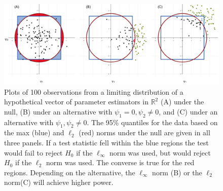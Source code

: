 \documentclass{article}
\begin{document}

\begin{figure}
	\centering
	\includegraphics[width = \linewidth]{figure_code/new_pwr_cmpr.jpeg}
	\caption{Plots of 100 observations from a limiting distribution of a hypothetical vector of parameter estimators in $\mathbb{R}^2$ (A) under the null, (B) under an alternative with $\psi_1 = 0, \psi_2 \neq 0$, and (C) under an alternative with $\psi_1, \psi_2 \neq 0$. The 95\% quantiles for the data based on the max (blue) and $\ell_2$ (red) norms under the null are given in all three panels. If a test statistic fell within the blue regions the test would fail to reject $H_0$ if the $\ell_\infty$ norm was used, but would reject $H_0$ if the $\ell_2$ norm was used.  The converse is true for the red regions.  Depending on the alternative, the $\ell_\infty$ norm (B) or the $\ell_2$ norm(C) will achieve higher power.}
	\label{fig:figure1}
\end{figure}
\end{document}
